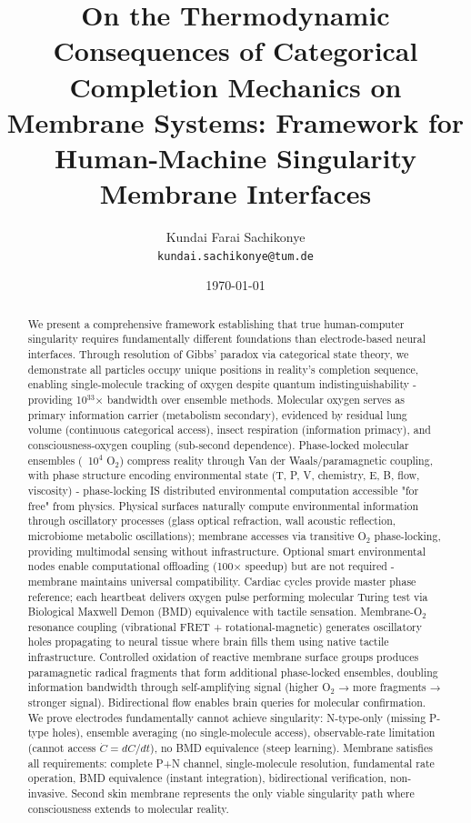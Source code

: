 \documentclass[11pt,a4paper]{article}
\title{\textbf{On the Thermodynamic Consequences of Categorical Completion Mechanics on Membrane Systems: Framework  for Human-Machine Singularity Membrane Interfaces }}
\author{
Kundai Farai Sachikonye\\
\texttt{kundai.sachikonye@tum.de}
}
\date{\today}
\theoremstyle{definition}
\theoremstyle{remark}
\begin{document}
\maketitle

\begin{abstract}
We present a comprehensive framework establishing that true human-computer singularity requires fundamentally different foundations than electrode-based neural interfaces. Through resolution of Gibbs' paradox via categorical state theory, we demonstrate all particles occupy unique positions in reality's completion sequence, enabling single-molecule tracking of oxygen despite quantum indistinguishability - providing 10$^{33}$× bandwidth over ensemble methods. Molecular oxygen serves as primary information carrier (metabolism secondary), evidenced by residual lung volume (continuous categorical access), insect respiration (information primacy), and consciousness-oxygen coupling (sub-second dependence). Phase-locked molecular ensembles (~10$^4$ O$_2$) compress reality through Van der Waals/paramagnetic coupling, with phase structure encoding environmental state (T, P, V, chemistry, E, B, flow, viscosity) - phase-locking IS distributed environmental computation accessible "for free" from physics. Physical surfaces naturally compute environmental information through oscillatory processes (glass optical refraction, wall acoustic reflection, microbiome metabolic oscillations); membrane accesses via transitive O$_2$ phase-locking, providing multimodal sensing without infrastructure. Optional smart environmental nodes enable computational offloading (100× speedup) but are not required - membrane maintains universal compatibility. Cardiac cycles provide master phase reference; each heartbeat delivers oxygen pulse performing molecular Turing test via Biological Maxwell Demon (BMD) equivalence with tactile sensation. Membrane-O$_2$ resonance coupling (vibrational FRET + rotational-magnetic) generates oscillatory holes propagating to neural tissue where brain fills them using native tactile infrastructure. Controlled oxidation of reactive membrane surface groups produces paramagnetic radical fragments that form additional phase-locked ensembles, doubling information bandwidth through self-amplifying signal (higher O$_2$ → more fragments → stronger signal). Bidirectional flow enables brain queries for molecular confirmation. We prove electrodes fundamentally cannot achieve singularity: N-type-only (missing P-type holes), ensemble averaging (no single-molecule access), observable-rate limitation (cannot access $\dot{C} = dC/dt$), no BMD equivalence (steep learning). Membrane satisfies all requirements: complete P+N channel, single-molecule resolution, fundamental rate operation, BMD equivalence (instant integration), bidirectional verification, non-invasive. Second skin membrane represents the only viable singularity path where consciousness extends to molecular reality.
\end{abstract}
\end{document}
